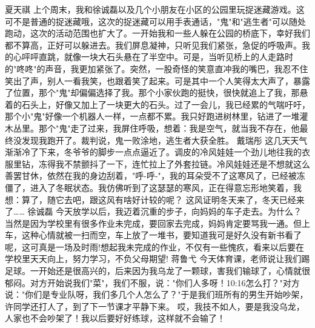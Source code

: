 {}\markdownRendererInterblockSeparator
{}夏天祺\markdownRendererInterblockSeparator
{}上个周末，我和徐诚磊以及几个小朋友在小区的公园里玩捉迷藏游戏。这可不是普通的捉迷藏哦，这次的捉迷藏可以用手表通话，"鬼"和"逃生者"可以随处跑动，这次的活动范围也扩大了。一开始我和一些人躲在公园的桥底下，幸好我们都不算高，正好可以躲进去。我们屏息凝神，只听见我们紧张，急促的呼吸声。我的心呯呯直跳，就像一块大石头悬在了半空中。可是，当听见桥上的人走路时的"咚咚"的声音，我更加紧张了。突然，一股奇怪的笑意直冲我的嘴巴，我忍不住笑出了声，别人一看我笑，也跟着笑了起来。可是其中一个人笑得太大声了，暴露了位置，那个"鬼"却偏偏选择了我。那个小家伙跑的挺快，很快就追上了我，那悬着的石头上，好像又加上了一块更大的石头。过了一会儿，我已经累的气喘吁吁，那个小"鬼"好像一个机器人一样，一点都不累。我只好跑进树林里，钻进了一堆灌木丛里。那个"鬼"走了过来，我屏住呼吸，想着：我是空气，就当我不存在，他最终没发现我跑开了。裁判说，鬼一败涂地，逃生者大获全胜。\markdownRendererInterblockSeparator
{}\markdownRendererInterblockSeparator
{}戴瑞彤\markdownRendererInterblockSeparator
{}这几天天气渐渐冷了下来，冬爷爷的脚步一点点逼近了。调皮的冷风娃娃一个劲儿地往我的衣服里钻，冻得我不禁颤抖了一下，连忙拉上了外套拉链。冷风娃娃还是不想就这么善罢甘休，依然在我的身边刮着，"呼-呼-"，我的耳朵受不了这寒风了，已经被冻僵了，进入了冬眠状态。我仿佛听到了这瑟瑟的寒风，正在得意忘形地笑着，我想：算了，随它去吧，跟这风有啥好计较的呢？\markdownRendererInterblockSeparator
{}这风证明冬天来了，冬天已经来了……\markdownRendererInterblockSeparator
{}\markdownRendererInterblockSeparator
{}徐诚磊\markdownRendererInterblockSeparator
{}今天放学以后，我迈着沉重的步子，向妈妈的车子走去。为什么？当然是因为学校里有很多作业未完成，要回家去完成，妈妈肯定要骂我一通。但上车，这种心情就被一扫而空，车上放了一堆书，要知道我可是好久没有新书看了呢，这可真是一场及时雨!想起我未完成的作业，不仅有一些愧疚，看来以后要在学校里天天向上，努力学习，不负父母期望!\markdownRendererInterblockSeparator
{}\markdownRendererInterblockSeparator
{}蒋鲁弋\markdownRendererInterblockSeparator
{}今天体育课，老师说让我们踢足球。一开始还是很高兴的，后来因为我乌龙了一颗球，害我们输球了，心情就很郁闷。对方开始说我们"菜"，我们不服，说："你们人多呀！10:16怎么打？"对方说："你们是专业队呀，我们多几个人怎么了？"于是我们班所有的男生开始吵架，许同学还打人了，到了下一节课才平静下来。\markdownRendererInterblockSeparator
{}哎，我技不如人，要是我没乌龙，人家也不会吵架了！我以后要好好练球，这样就不会输了！\markdownRendererInterblockSeparator
